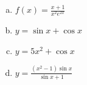 \documentclass[12pt,letterpaper]{article}
\begin{document}
\begin{enumerate}[1.]
\begin{enumerate}[(a)]
	\vspace{25pc}
	\item $\displaystyle f(x)=\frac{x+1}{x^2e^{2x}}$

\newpage	
	\item $y=\sin x+\cos x$
	
	\vspace{16pc}
	\item $y=5x^2+\cos x$
	
	\vspace{16pc}
	\item $\displaystyle y=\frac{(x^2-1)\sin x}{\sin x+1}$
	\end{enumerate}
\end{enumerate}

\end{document}
